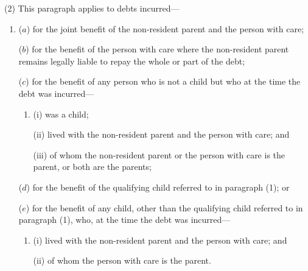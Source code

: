 \documentclass[12pt,a4paper]{article}
\begin{document}
(2) This paragraph applies to debts incurred—
\begin{enumerate}\item[]
($a$) for the joint benefit of the non-resident parent and the person with care;

($b$) for the benefit of the person with care where the non-resident parent remains legally liable to repay the whole or part of the debt;

($c$) for the benefit of any person who is not a child but who at the time the debt was incurred—
\begin{enumerate}\item[]
(i) was a child;

(ii) lived with the non-resident parent and the person with care; and

(iii) of whom the non-resident parent or the person with care is the parent, or both are the parents;
\end{enumerate}

($d$) for the benefit of the qualifying child referred to in paragraph (1); or

($e$) for the benefit of any child, other than the qualifying child referred to in paragraph (1), who, at the time the debt was incurred—
\begin{enumerate}\item[]
(i) lived with the non-resident parent and the person with care; and

(ii) of whom the person with care is the parent.
\end{enumerate}
\end{enumerate}
\end{document}
